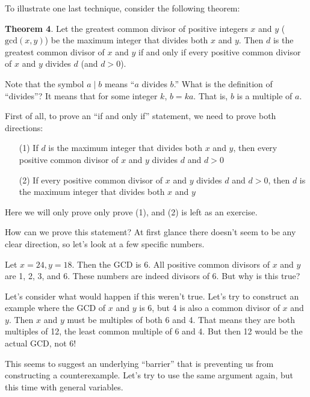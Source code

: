 \documentclass[11pt]{article}
\begin{document}

    To illustrate one last technique, consider the following theorem:
    
    \textbf{Theorem 4}. Let the greatest common divisor of positive integers $x$ and $y$
    ($\mathrm{gcd}(x,y)$) be the maximum integer that divides both $x$ and $y$. Then $d$ is
    the greatest common divisor of $x$ and $y$ if and only if every positive common divisor
    of $x$ and $y$ divides $d$ (and $d>0$).
    
    Note that the symbol $a\mid b$ means ``$a$ divides $b$.'' What is the definition of
    ``divides''? It means that for some integer $k$, $b=ka$. That is, $b$ is a multiple
    of $a$.
    
    First of all, to prove an ``if and only if'' statement, we need to prove both directions:
    \begin{enumerate}
        \item[(1)] If $d$ is the maximum integer that divides both $x$ and $y$, then every positive
        common divisor of $x$ and $y$ divides $d$ and $d>0$
        
        \item[(2)] If every positive common divisor of $x$ and $y$ divides $d$ and $d>0$, then $d$ is
        the maximum integer that divides both $x$ and $y$
    \end{enumerate}
    
    Here we will only prove only prove (1), and (2) is left as an exercise.
    
    How can we prove this statement? At first glance there doesn't seem to be any clear
    direction, so let's look at a few specific numbers.
    
    Let $x=24,y=18$. Then the GCD is 6. All positive common divisors of $x$ and $y$ are
    1, 2, 3, and 6. These numbers are indeed divisors of 6. But why is this true?
    
    Let's consider what would happen if this weren't true. Let's try to construct an
    example where the GCD of $x$ and $y$ is 6, but 4 is also a common divisor of
    $x$ and $y$. Then $x$ and $y$ must be multiples of both 6 and 4. That means
    they are both multiples of 12, the least common multiple of 6 and 4. But then 12
    would be the actual GCD, not 6!
    
    This seems to suggest an underlying ``barrier'' that is preventing us from
    constructing a counterexample. Let's try to use the same argument again, but
    this time with general variables.
    
\end{document}
